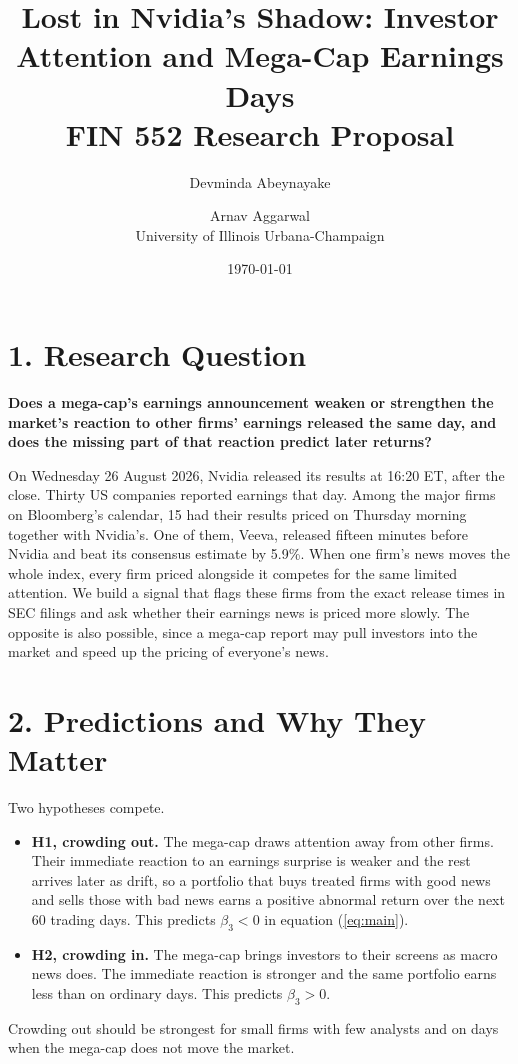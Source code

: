 \documentclass[11pt]{article}
\title{Lost in Nvidia's Shadow: Investor Attention and Mega-Cap Earnings Days\\[4pt]
  \large FIN 552 Research Proposal}
\author{Devminda Abeynayake \and Arnav Aggarwal\\[2pt]
  \small University of Illinois Urbana-Champaign}
\date{\today}
\begin{document}
\maketitle
\vspace{-1.5em}

\section*{1. Research Question}

\textbf{Does a mega-cap's earnings announcement weaken or strengthen the market's reaction to other firms' earnings released the same day, and does the missing part of that reaction predict later returns?}

On Wednesday 26 August 2026, Nvidia released its results at 16:20 ET, after the close. Thirty US companies reported earnings that day. Among the major firms on Bloomberg's calendar, 15 had their results priced on Thursday morning together with Nvidia's. One of them, Veeva, released fifteen minutes before Nvidia and beat its consensus estimate by 5.9\%. When one firm's news moves the whole index, every firm priced alongside it competes for the same limited attention. We build a signal that flags these firms from the exact release times in SEC filings and ask whether their earnings news is priced more slowly. The opposite is also possible, since a mega-cap report may pull investors into the market and speed up the pricing of everyone's news.

\section*{2. Predictions and Why They Matter}

Two hypotheses compete.
\begin{itemize}
  \item \textbf{H1, crowding out.} The mega-cap draws attention away from other firms. Their immediate reaction to an earnings surprise is weaker and the rest arrives later as drift, so a portfolio that buys treated firms with good news and sells those with bad news earns a positive abnormal return over the next 60 trading days. This predicts $\beta_3 < 0$ in equation (\ref{eq:main}).
  \item \textbf{H2, crowding in.} The mega-cap brings investors to their screens as macro news does. The immediate reaction is stronger and the same portfolio earns less than on ordinary days. This predicts $\beta_3 > 0$.
\end{itemize}
Crowding out should be strongest for small firms with few analysts and on days when the mega-cap does not move the market.
\end{document}
